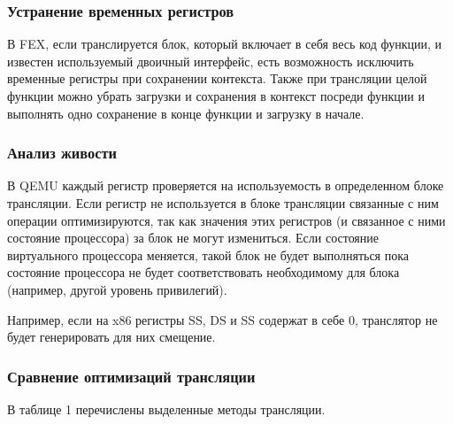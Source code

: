 \subsubsection{Устранение временных регистров}

В FEX, если транслируется блок, который включает в себя весь код функции, и известен используемый двоичный интерфейс, есть возможность исключить временные регистры при сохранении контекста. Также при трансляции целой функции можно убрать загрузки и сохранения в контекст посреди функции и выполнять одно сохранение в конце функции и загрузку в начале.

\subsubsection{Анализ живости}

В QEMU каждый регистр проверяется на используемость в определенном блоке трансляции. Если регистр не используется в блоке трансляции связанные с ним операции оптимизируются, так как значения этих регистров (и связанное с ними состояние процессора) за блок не могут измениться. Если состояние виртуального процессора меняется, такой блок не будет выполняться пока состояние процессора не будет соответствовать необходимому для блока (например, другой уровень привилегий).

Например, если на x86 регистры SS, DS и SS содержат в себе 0, транслятор не будет генерировать для них смещение.

\subsubsection{Сравнение оптимизаций трансляции}

В таблице 1 %
перечислены выделенные методы трансляции. 

